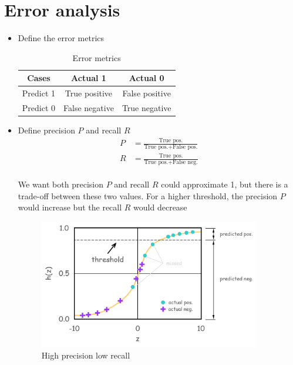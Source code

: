 \section{Error analysis}
\begin{itemize}
    \item Define the error metrics
    \begin{table}[H]
        \renewcommand\arraystretch{1.5}
        \caption{Error metrics}
        \centering
        \begin{tabular}{ccc}
            \hline %
            Cases      & Actual 1       & Actual 0       \\ 
            \hline %
            Predict 1  & True positive  & False positive \\ 
            Predict 0  & False negative & True negative  \\
            \hline %
        \end{tabular}
    \end{table}

    \item Define precision $P$ and recall $R$
    \begin{equation}
        \begin{aligned}
            P &= \frac{\text{True pos.}}{\text{True pos.} + \text{False pos.}} \\
            R &= \frac{\text{True pos.}}{\text{True pos.} + \text{False neg.}} \\
        \end{aligned}
    \end{equation}
    
    We want both precision $P$ and recall $R$ could approximate 1, but there is a trade-off between these two values.
    For a higher threshold, the precision $P$ would increase but the recall $R$ would decrease
    \begin{figure}[H]
        \centering
        \includegraphics[width=3.8in]{./images/error_highPrecisionLowRecall.png}
        \caption{High precision low recall}
    \end{figure}
    

\end{itemize}

